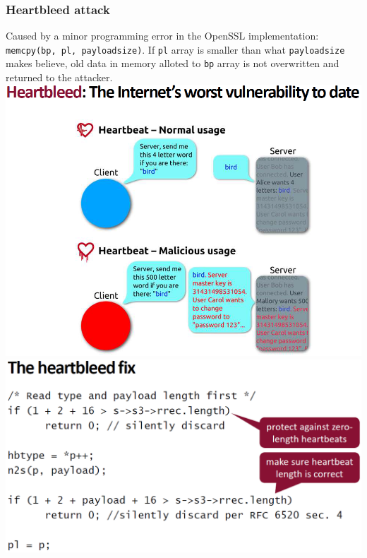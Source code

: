 \documentclass[12pt]{article}
\begin{document}
 \subsubsection{Heartbleed attack}
 Caused by a minor programming error in the OpenSSL implementation: \texttt{memcpy(bp, pl, payloadsize)}. If \texttt{pl} array is smaller than what \texttt{payloadsize} makes believe, old data in memory alloted to \texttt{bp} array is not overwritten and returned to the attacker.\\
 \includegraphics[width=\linewidth]{./slides/L7P3HBA.PNG}\\
 \includegraphics[width=\linewidth]{./slides/L7P3HBAF.PNG}
 
\end{document}
